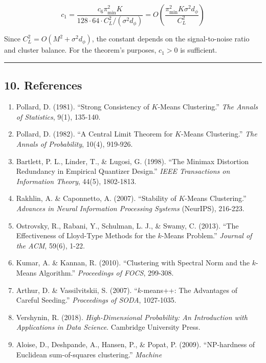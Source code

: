 \documentclass[
  12pt,
]{article}
\begin{document}
\[c_1 = \frac{c_6 \pi_{\min}^2 K}{128 \cdot 64 \cdot C_L^2 / (\sigma^2 d_\phi)} = O\left(\frac{\pi_{\min}^2 K \sigma^2 d_\phi}{C_L^2}\right)\]

Since \(C_L^2 = O(M^2 + \sigma^2 d_\phi)\), the constant depends on the
signal-to-noise ratio and cluster balance. For the theorem's purposes,
\(c_1 > 0\) is sufficient.

\begin{center}\rule{0.5\linewidth}{0.5pt}\end{center}

\subsection{10. References}\label{references}

\begin{enumerate}
\def\labelenumi{\arabic{enumi}.}
\item
  Pollard, D. (1981). ``Strong Consistency of \(K\)-Means Clustering.''
  \emph{The Annals of Statistics}, 9(1), 135-140.
\item
  Pollard, D. (1982). ``A Central Limit Theorem for \(K\)-Means
  Clustering.'' \emph{The Annals of Probability}, 10(4), 919-926.
\item
  Bartlett, P. L., Linder, T., \& Lugosi, G. (1998). ``The Minimax
  Distortion Redundancy in Empirical Quantizer Design.'' \emph{IEEE
  Transactions on Information Theory}, 44(5), 1802-1813.
\item
  Rakhlin, A. \& Caponnetto, A. (2007). ``Stability of \(K\)-Means
  Clustering.'' \emph{Advances in Neural Information Processing Systems}
  (NeurIPS), 216-223.
\item
  Ostrovsky, R., Rabani, Y., Schulman, L. J., \& Swamy, C. (2013). ``The
  Effectiveness of Lloyd-Type Methods for the \(k\)-Means Problem.''
  \emph{Journal of the ACM}, 59(6), 1-22.
\item
  Kumar, A. \& Kannan, R. (2010). ``Clustering with Spectral Norm and
  the \(k\)-Means Algorithm.'' \emph{Proceedings of FOCS}, 299-308.
\item
  Arthur, D. \& Vassilvitskii, S. (2007). ``\(k\)-means++: The
  Advantages of Careful Seeding.'' \emph{Proceedings of SODA},
  1027-1035.
\item
  Vershynin, R. (2018). \emph{High-Dimensional Probability: An
  Introduction with Applications in Data Science}. Cambridge University
  Press.
\item
  Aloise, D., Deshpande, A., Hansen, P., \& Popat, P. (2009).
  ``NP-hardness of Euclidean sum-of-squares clustering.'' \emph{Machine
}
\end{enumerate}
\end{document}
